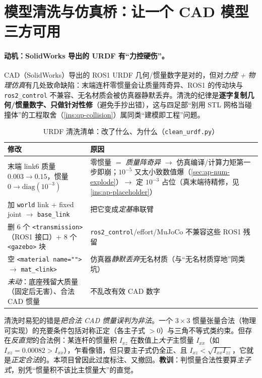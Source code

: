 \section{模型清洗与仿真桥：让一个 CAD 模型三方可用}
\label{sec:ap-model}

\paragraph{动机：SolidWorks 导出的 URDF 有“力控硬伤”。}
CAD（SolidWorks）导出的 ROS1 URDF 几何/惯量数字是对的，但对\emph{力控 + 物理仿真}有几处致命缺陷：末端连杆零惯量会让质量阵奇异、ROS1 的传动块与 \texttt{ros2\_control} 不兼容、无名材质会被仿真器静默丢弃。清洗的纪律是\textbf{逐字复制几何/惯量数字、只做针对性修}（避免手抄出错），这与四足部“别用 STL 网格当碰撞体”的工程取舍（\cref{ins:qp-collision}）属同类“建模即工程”问题。

\begin{table}[H]\centering\small
\caption{URDF 清洗清单：改了什么、为什么（\texttt{clean\_urdf.\allowbreak py}）}
\begin{tabular}{p{} p{}}
\toprule
修改 & 原因 \\
\midrule
末端 link6 质量 $0.003\!\to\!0.15$，惯量 $0\!\to\!\mathrm{diag}(10^{-3})$ & 零惯量 $=$ \emph{质量阵奇异} $\to$ 仿真编译/计算力矩第一步即崩；$10^{-5}$ 又太小致数值爆（\cref{sec:ap-num-explode}）$\to$ 定 $10^{-3}$ 占位（真末端待精修，见 \cref{ins:ap-placeholder}）\\
加 \texttt{world} link + fixed joint $\to$ \texttt{base\_link} & 把它变成\emph{定基}串联臂 \\
删 6 个 \texttt{<transmission>}（ROS1 接口）+ 8 个 \texttt{<gazebo>} 块 & \texttt{ros2\_control}/effort/MuJoCo 不兼容这些 ROS1 残留 \\
空 \texttt{<material name="">} $\to$ \texttt{mat\_<link>} & 仿真器\emph{静默丢弃}无名材质（与“无名材质穿地”同类坑）\\
\emph{未动}：底座残留大质量（固定后无害）、合法 CAD 惯量 & 不乱改有效 CAD 数字 \\
\bottomrule
\end{tabular}
\label{tab:ap-cleanurdf}
\end{table}

\begin{pitfall}\label{pit:ap-inertia-pd}
清洗时易犯的错是\emph{把合法 CAD 惯量误判为非法}。一个 $3\times3$ 惯量张量合法（物理可实现）的充要条件包括对称正定（各主子式 $>0$）与三角不等式类约束。但存在\emph{反直觉}的合法例：某连杆的惯量积 $I_{xz}$ 在数值上\emph{大于}主惯量 $I_{xx}$（如 $I_{xz}=0.00082>I_{xx}$），乍看像错，但只要主子式仍全正、且 $I_{xz}<\sqrt{I_{xx}I_{zz}}$，它就是\emph{正定合法}的。本项目曾因此过度标注、又撤回。\textbf{教训}：判惯量合法性要算\emph{主子式}，别凭“惯量积不该比主惯量大”的直觉。
\end{pitfall}

